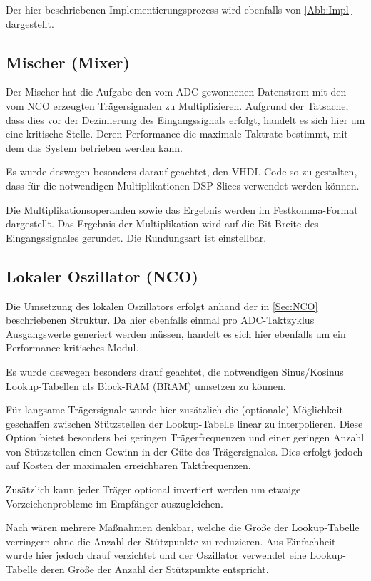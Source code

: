 Der hier beschriebenen Implementierungsprozess wird ebenfalls von \ref{Abb:Impl} dargestellt.

\clearpage

\subsection{Mischer (Mixer)}
Der Mischer hat die Aufgabe den vom \acs{ADC} gewonnenen Datenstrom mit den vom \acs{NCO} erzeugten Trägersignalen zu Multiplizieren.
Aufgrund der Tatsache, dass dies vor der Dezimierung des Eingangssignals erfolgt, handelt es sich hier um eine kritische Stelle. 
Deren Performance die maximale Taktrate bestimmt, mit dem das System betrieben werden kann.

Es wurde deswegen besonders darauf geachtet, den \acs{VHDL}-Code so zu gestalten, dass für die notwendigen Multiplikationen \acs{DSP}-Slices verwendet werden können.

Die Multiplikationsoperanden sowie das Ergebnis werden im Festkomma-Format dargestellt.
Das Ergebnis der Multiplikation wird auf die Bit-Breite des Eingangssignales gerundet. Die Rundungsart ist einstellbar. 

\subsection{Lokaler Oszillator (NCO)}
Die Umsetzung des lokalen Oszillators erfolgt anhand der in \ref{Sec:NCO} beschriebenen Struktur.
Da hier ebenfalls einmal pro \acs{ADC}-Taktzyklus Ausgangswerte generiert werden müssen, handelt es sich hier ebenfalls um ein Performance-kritisches Modul.

Es wurde deswegen besonders drauf geachtet, die notwendigen Sinus/Kosinus Lookup-Tabellen als Block-RAM (\acs{BRAM}) umsetzen zu können.

Für langsame Trägersignale wurde hier zusätzlich die (optionale) Möglichkeit geschaffen zwischen Stützstellen der Lookup-Tabelle linear zu interpolieren.
Diese Option bietet besonders bei geringen Trägerfrequenzen und einer geringen Anzahl von Stützstellen einen Gewinn in der Güte des Trägersignales.
Dies erfolgt jedoch auf Kosten der maximalen erreichbaren Taktfrequenzen.

Zusätzlich kann jeder Träger optional invertiert werden um etwaige Vorzeichenprobleme im Empfänger auszugleichen.

Nach \cite{IEEE_ART_DDS} wären mehrere Maßnahmen denkbar, welche die Größe der Lookup-Tabelle verringern ohne die Anzahl der Stützpunkte zu reduzieren.
Aus Einfachheit wurde hier jedoch drauf verzichtet und der Oszillator verwendet eine Lookup-Tabelle deren Größe der Anzahl der Stützpunkte entspricht.

